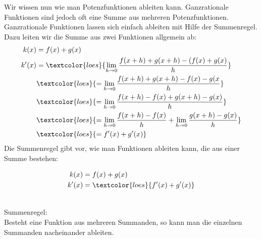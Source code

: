 Wir wissen nun wie man Potenzfunktionen ableiten kann. Ganzrationale Funktionen sind jedoch oft eine Summe aus mehreren Potenzfunktionen. Ganzrationale Funktionen lassen sich einfach ableiten mit Hilfe der Summenregel. Dazu leiten wir die Summe aus zwei Funktionen allgemein ab:\\
\begin{align*}
	k(x)&=f(x)+g(x)\\
	k'(x)&=\textcolor{loes}{\lim\limits_{h\to 0}\frac{f(x+h)+g(x+h)-(f(x)+g(x)}{h}}\\
	&\textcolor{loes}{=\lim\limits_{h\to 0}\frac{f(x+h)+g(x+h)-f(x)-g(x}{h}}\\
	&\textcolor{loes}{=\lim\limits_{h\to 0}\frac{f(x+h)-f(x)+g(x+h)-g(x)}{h}}\\
	&\textcolor{loes}{=\lim\limits_{h\to 0}\frac{f(x+h)-f(x)}{h}+\lim\limits_{h\to 0}\frac{g(x+h)-g(x)}{h}}\\
	&\textcolor{loes}{=f'(x)+g'(x)}\\
\end{align*}
Die Summenregel gibt vor, wie man Funktionen ableiten kann, die aus einer Summe bestehen:
\begin{minipage}[t]{\textwidth}
	\begin{minipage}{0.29\textwidth}
		\begin{align*}
			k(x)&=f(x)+g(x)\\
			k'(x)&=\textcolor{loes}{f'(x)+g'(x)}\\
		\end{align*}
	\end{minipage}
	\begin{minipage}{0.69\textwidth}
		\begin{tcolorbox}
			\phantom{text}\\
			\textcolor{loestc}{Summenregel:\\
				Besteht eine Funktion aus mehreren Summanden, so kann man die einzelnen Summanden nacheinander ableiten.}\\
		\end{tcolorbox}
	\end{minipage}
\end{minipage}\\

